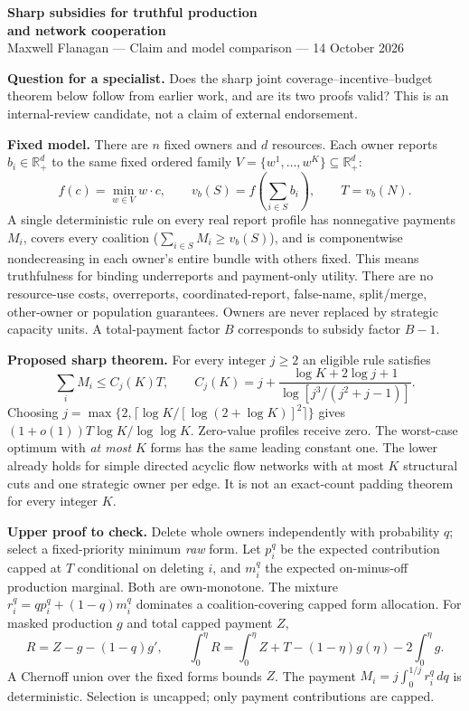 \documentclass[11pt]{article}
\begin{document}
\begin{center}
{\Large\bfseries Sharp subsidies for truthful production\\and network cooperation}\\[5pt]
Maxwell Flanagan --- Claim and model comparison --- 14 October 2026
\end{center}
\textbf{Question for a specialist.} Does the sharp joint coverage--incentive--budget
theorem below follow from earlier work, and are its two proofs valid?
This is an internal-review candidate, not a claim of external endorsement.

\textbf{Fixed model.} There are $n$ fixed owners and $d$ resources. Each owner
reports $b_i\in\mathbb R_+^d$ to the same fixed ordered family
$V=\{w^1,\ldots,w^K\}\subseteq\mathbb R_+^d$:
\[
 f(c)=\min_{w\in V}w\cdot c,\qquad
 v_b(S)=f\left(\sum_{i\in S}b_i\right),\qquad T=v_b(N).
\]
A single deterministic rule on every real report profile has nonnegative
payments $M_i$, covers every coalition ($\sum_{i\in S}M_i\ge v_b(S)$), and
is componentwise nondecreasing in each owner's entire bundle with others fixed.
This means truthfulness for binding underreports and payment-only utility.
There are no resource-use costs, overreports, coordinated-report, false-name,
split/merge, other-owner or population guarantees. Owners are never replaced
by strategic capacity units. A total-payment factor $B$ corresponds to subsidy
factor $B-1$.

\textbf{Proposed sharp theorem.} For every integer $j\ge2$ an eligible rule satisfies
\[
 \sum_iM_i\le C_j(K)T,\qquad
 C_j(K)=j+\frac{\log K+2\log j+1}{\log[j^3/(j^2+j-1)]}.
\]
Choosing $j=\max\{2,\lceil\log K/[\log(2+\log K)]^2\rceil\}$ gives
$(1+o(1))T\log K/\log\log K$. Zero-value profiles receive zero.
The worst-case optimum with \emph{at most} $K$ forms has the same leading
constant one. The lower already holds for simple directed acyclic flow
networks with at most $K$ structural cuts and one strategic owner per edge.
It is not an exact-count padding theorem for every integer $K$.

\textbf{Upper proof to check.} Delete whole owners independently with probability
$q$; select a fixed-priority minimum \emph{raw} form. Let $p_i^q$ be the
expected contribution capped at $T$ conditional on deleting $i$, and $m_i^q$
the expected on-minus-off production marginal. Both are own-monotone.
The mixture $r_i^q=qp_i^q+(1-q)m_i^q$ dominates a coalition-covering capped
form allocation. For masked production $g$ and total capped payment $Z$,
\[
 R=Z-g-(1-q)g',\qquad
 \int_0^\eta R=\int_0^\eta Z+T-(1-\eta)g(\eta)-2\int_0^\eta g.
\]
A Chernoff union over the fixed forms bounds $Z$. The payment
$M_i=j\int_0^{1/j}r_i^q\,dq$ is deterministic. Selection is uncapped;
only payment contributions are capped.
\end{document}
